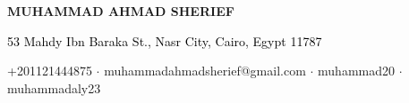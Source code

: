 \begin{center}

    \textcolor{themecolor}{\fontsize{14pt}{10}\textbf{MUHAMMAD AHMAD SHERIEF}}

    \vspace{1mm}

    \textcolor{black}{\fontsize{10pt}{10pt} 53 Mahdy Ibn Baraka St., Nasr City, Cairo, Egypt 11787}

    \vspace{1mm}

    {\faMobile} +201121444875 $\cdot$
    \href{mailto:muhammadahmadsherief@gmail.com}{\faEnvelope} muhammadahmadsherief@gmail.com $\cdot$
    \href{https://github.com/muhammad20/}{\faGithub} muhammad20 $\cdot$
    \href{https://www.linkedin.com/in/muhammadaly23/}{\faLinkedinSquare} muhammadaly23

\end{center}